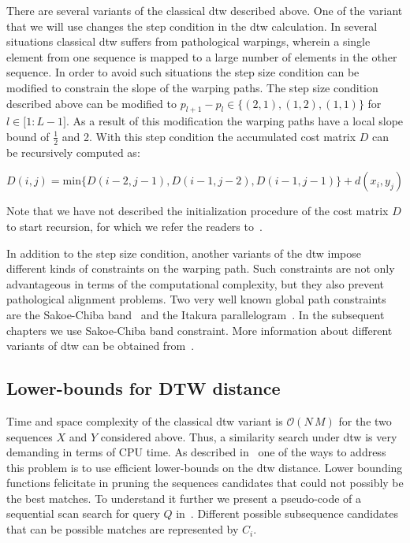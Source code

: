 There are several variants of the classical \gls{dtw} described above. One of the variant that we will use changes the step condition in the \gls{dtw} calculation. In several situations classical \gls{dtw} suffers from pathological warpings, wherein a single element from one sequence is mapped to a large number of elements in the other sequence. In order to avoid such situations the step size condition can be modified to constrain the slope of the warping paths. The step size condition described above can be modified to $p_{l+1}-p_l \in \lbrace (2,1), (1,2), (1,1) \rbrace$ for $l \in \lbrack 1: L-1 \rbrack$. As a result of this modification the warping paths have a local slope bound of $\frac{1}{2}$ and 2. With this step condition the accumulated cost matrix $D$ can be recursively computed as:

\begin{equation}
\label{eq:dtw_local_constraint_cost_matrix_computation}
D(i,j) = \mathrm{min} \lbrace D(i-2,j-1), D(i-1,j-2), D(i-1,j-1)\rbrace + d(x_i, y_j)
\end{equation}

Note that we have not described the initialization procedure of the cost matrix $D$ to start recursion, for which we refer the readers to~\cite{muller2007dynamic}.

In addition to the step size condition, another variants of the \gls{dtw} impose different kinds of constraints on the warping path. Such constraints are not only advantageous in terms of the computational complexity, but they also prevent pathological alignment problems. Two very well known global path constraints are the Sakoe-Chiba band~\citep{Sakoe78TASLP} and the Itakura parallelogram~\citep{itakura1975minimum}. In the subsequent chapters we use Sakoe-Chiba band constraint. More information about different variants of \gls{dtw} can be obtained from~\citep{rabiner1993fundamentals,muller2007dynamic}.

\subsection{Lower-bounds for DTW distance}
\label{sec:background_lowerbound}

Time and space complexity of the classical \gls{dtw} variant is $\mathcal{O}(N\,M)$ for the two sequences $X$ and $Y$ considered above. Thus, a similarity search under \gls{dtw} is very demanding in terms of CPU time. As described in~\cite{Keogh2004} one of the ways to address this problem is to use efficient lower-bounds on the \gls{dtw} distance. Lower bounding functions felicitate in pruning the sequences candidates that could not possibly be the best matches. To understand it further we present a pseudo-code of a sequential scan search for query $Q$ in~. Different possible subsequence candidates that can be possible matches are represented by $C_i$.%

